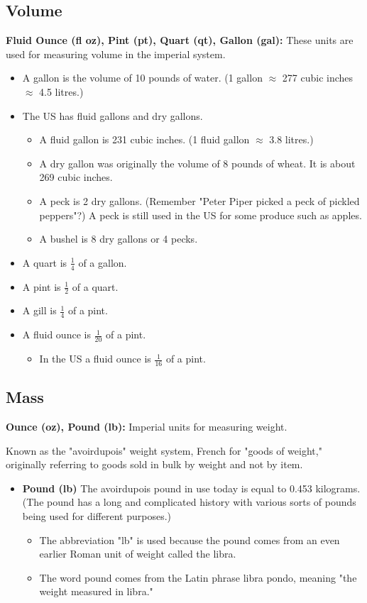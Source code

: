 \documentclass{article}
\begin{document}
\subsection*{Volume}
\textbf{Fluid Ounce (fl oz), Pint (pt), Quart (qt), Gallon (gal):} These units are used for measuring volume in the imperial system.

\begin{itemize}
\item A gallon is the volume of 10 pounds of water. (1 gallon $\approx$ 277 cubic inches $\approx$ 4.5 litres.)
\item The US has fluid gallons and dry gallons.
  \begin{itemize}
  \item A fluid gallon is 231 cubic inches. (1 fluid gallon $\approx$ 3.8 litres.)
  \item A dry gallon was originally the volume of 8 pounds of wheat. It is about 269 cubic inches.
  \item A peck is 2 dry gallons. (Remember "Peter Piper picked a peck of pickled peppers"?) A peck is still used in the US for some produce such as apples.
  \item A bushel is 8 dry gallons or 4 pecks.
  \end{itemize}
\item A quart is $\frac{1}{4}$ of a gallon.
\item A pint is $\frac{1}{2}$ of a quart.
\item A gill is $\frac{1}{4}$ of a pint.
\item A fluid ounce is $\frac{1}{20}$ of a pint.
  \begin{itemize}
  \item In the US a fluid ounce is $\frac{1}{16}$ of a pint.
  \end{itemize}
\end{itemize}

\subsection*{Mass}
\textbf{Ounce (oz), Pound (lb):} Imperial units for measuring weight.

Known as the "avoirdupois" weight system, French for "goods of weight," originally referring to goods sold in bulk by weight and not by item.

\begin{itemize}
\item \textbf{Pound (lb)} The avoirdupois pound in use today is equal to 0.453 kilograms. (The pound has a long and complicated history with various sorts of pounds being used for different purposes.)
  \begin{itemize}
  \item The abbreviation "lb" is used because the pound comes from an even earlier Roman unit of weight called the libra.
  \item The word pound comes from the Latin phrase libra pondo, meaning "the weight measured in libra."
  \end{itemize}
\end{itemize}
\end{document}

